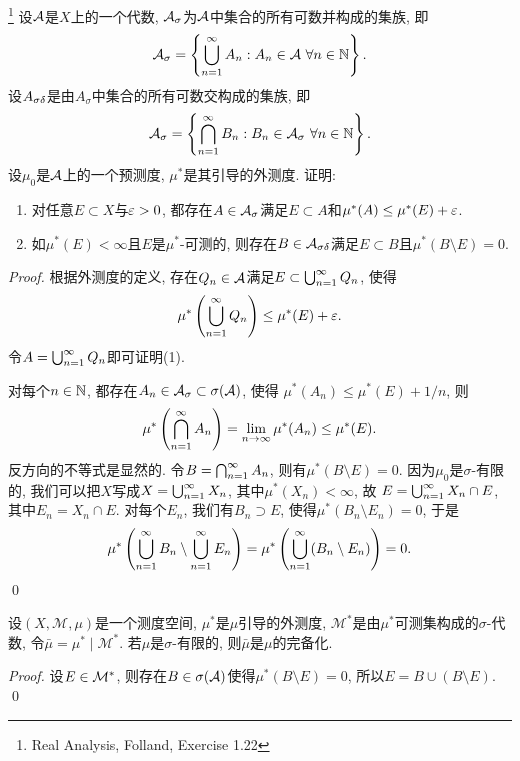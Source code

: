 \begin{exercise}\footnote{Real Analysis, Folland, Exercise 1.22}\label{ex1-22}
    设$\mathcal{A}$是$X$上的一个代数, $\mathcal{A}_\sigma$为$\mathcal{A}$中集合的所有可数并构成的集族, 即
    $$\mathcal{A}_\sigma = \left\{\bigcup_{n=1}^{\infty}A_n: A_n \in \mathcal{A}~\forall n \in \mathbb{N} \right\}.$$
    设$A_{\sigma \delta}$是由$A_\sigma$中集合的所有可数交构成的集族, 即
    $$\mathcal{A}_\sigma = \left\{\bigcap_{n=1}^{\infty}B_n: B_n \in \mathcal{A}_\sigma~\forall n \in \mathbb{N} \right\}.$$ 设$\mu_0$是$\mathcal{A}$上的一个预测度, $\mu^*$是其引导的外测度. 证明:
    \begin{enumerate}
        \item 对任意$E \subset X$与$\varepsilon > 0$, 都存在$A \in \mathcal{A}_\sigma$满足$E \subset A$和$\mu^*(A) \leq \mu^*(E) + \varepsilon$. 
        \item 如$\mu^*(E) < \infty$且$E$是$\mu^*$-可测的, 则存在$B \in \mathcal{A}_{\sigma \delta}$满足$E \subset B$且$\mu^*(B \setminus E) = 0$. 
    \end{enumerate}
\end{exercise}
\begin{proof}
    根据外测度的定义, 存在$Q_n \in \mathcal{A}$满足$E \subset \bigcup_{n=1}^{\infty}Q_n$, 使得
    $$\mu^*\left(\bigcup_{n=1}^{\infty}Q_n\right) \leq \mu^*(E) + \varepsilon. $$
    令$A = \bigcup_{n=1}^{\infty}Q_n$即可证明(1). 

    对每个$n \in \mathbb{N}$, 都存在$A_n \in \mathcal{A}_\sigma \subset \sigma(\mathcal{A})$, 使得
    $\mu^*(A_n) \leq \mu^*(E) + 1/n$,
    则 
    $$\mu^*\left(\bigcap_{n=1}^{\infty}A_n\right)
    = \lim_{n \to \infty}\mu^*(A_n) \leq \mu^*(E).$$
    反方向的不等式是显然的. 令$B = \bigcap_{n=1}^{\infty}A_n$, 则有$\mu^*(B \setminus E) = 0$.
    因为$\mu_0$是$\sigma$-有限的, 我们可以把$X$写成$X = \bigcup_{n=1}^{\infty}X_n$, 其中$\mu^*(X_n) < \infty$, 
    故
    $E = \bigcup_{n=1}^{\infty}X_n \cap E$, 
    其中$E_n = X_n \cap E$. 对每个$E_n$, 我们有$B_n \supset E$, 使得$\mu^*(B_n \setminus E_n) = 0$, 于是
    $$\mu^*\left(\bigcup_{n=1}^{\infty}B_n \setminus \bigcup_{n=1}^{\infty}E_n\right) = 
    \mu^*\left(\bigcup_{n=1}^{\infty}(B_n \setminus E_n)\right) = 0.$$ \qed 
\end{proof}
\begin{exercise}
    设$(X, \mathcal{M}, \mu)$是一个测度空间, $\mu^*$是$\mu$引导的外测度, 
    $\mathcal{M}^*$是由$\mu^*$可测集构成的$\sigma$-代数, 令$\bar{\mu}=\mu^* \mid \mathcal{M}^*$.
    若$\mu$是$\sigma$-有限的, 则$\bar{\mu}$是$\mu$的完备化. 
\end{exercise}
\begin{proof}
    设$E \in \mathcal{M}^*$, 则存在$B \in \sigma(\mathcal{A})$使得$\mu^*(B \setminus E) = 0$, 所以$E = B \cup (B \setminus E)$. \qed 
\end{proof}

